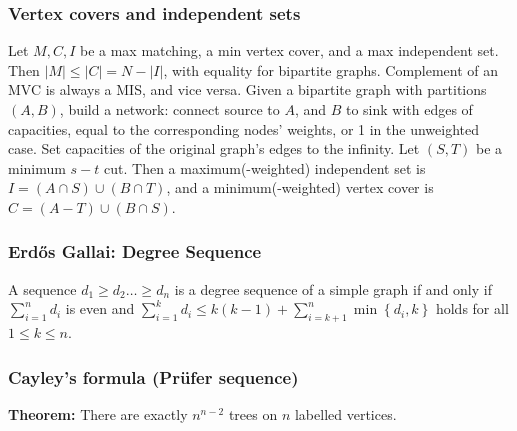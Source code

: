 \documentclass{article}
\begin{document}
\begin{multicols}{3}
\subsubsection{Vertex covers and independent sets}
Let $M, C, I$ be a max matching, a min vertex cover, and a max independent set. Then $|M| \le |C| = N -|I|$, with equality for bipartite graphs. Complement of an MVC is always a MIS, and vice versa. Given a bipartite graph with partitions $(A,B)$, build a network: connect source to $A$, and $B$ to sink with edges of capacities, equal to the corresponding nodes' weights, or 1 in the unweighted case. Set capacities of the original graph's edges to the infinity.
Let $(S, T)$ be a minimum $s-t$ cut. Then a maximum(-weighted) independent set is $I = (A \cap S)\cup(B \cap T)$,
and a minimum(-weighted) vertex cover is $C = (A - T) \cup (B \cap S)$.

\subsubsection{Erd\H{o}s Gallai: Degree Sequence}
A sequence $d_1 \geq d_2\dots \geq d_n$ is a degree sequence of a simple graph if and only if $\sum_{i = 1}^{n}d_i$ is even and $ \sum_{i = 1}^{k}d_i \leq k\left(k - 1\right) +  \sum_{i = k + 1}^{n} \min \left\{d_i, k\right\}$ holds for all $1 \leq k \leq n$.

\subsubsection{Cayley's formula (Prüfer sequence)}
\noindent\textbf{Theorem:} There are exactly $n^{n - 2}$ trees on $n$ labelled vertices.


\end{multicols}
\end{document}

